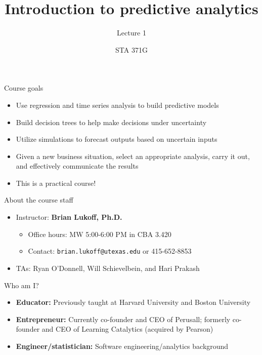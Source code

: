 \documentclass{beamer}\usepackage[]{graphicx}\usepackage[]{color}
\title{Introduction to predictive analytics}
\subtitle{Lecture 1}
\author{STA 371G}
\begin{document}
  
  

  \frame{\maketitle}



  \begin{darkframes}
    \begin{frame}{Course goals}
      \begin{itemize}
        \item Use regression and time series analysis to build predictive models
        \item Build decision trees to help make decisions under uncertainty
        \item Utilize simulations to forecast outputs based on uncertain inputs
        \item Given a new business situation, select an appropriate analysis, carry it out, and effectively communicate the results
        \item \alert{This is a practical course!}
      \end{itemize}
    \end{frame}

    \begin{frame}{About the course staff}
      \begin{itemize}
        \item Instructor: \textbf{Brian Lukoff, Ph.D.}
          \begin{itemize}
            \item Office hours: MW 5:00-6:00 PM in CBA 3.420
            \item Contact: \texttt{brian.lukoff@utexas.edu} or 415-652-8853
          \end{itemize}
        \item TAs: Ryan O'Donnell, Will Schievelbein, and Hari Prakash
      \end{itemize}
    \end{frame}

    \begin{frame}{Who am I?}
      \begin{itemize}
        \item \textbf{Educator:} Previously taught at Harvard University and Boston University
        \item \textbf{Entrepreneur:} Currently co-founder and CEO of Perusall; formerly co-founder and CEO of Learning Catalytics (acquired by Pearson)
        \item \textbf{Engineer/statistician:} Software engineering/analytics background
      \end{itemize}
    \end{frame}


\end{darkframes}
\end{document}
